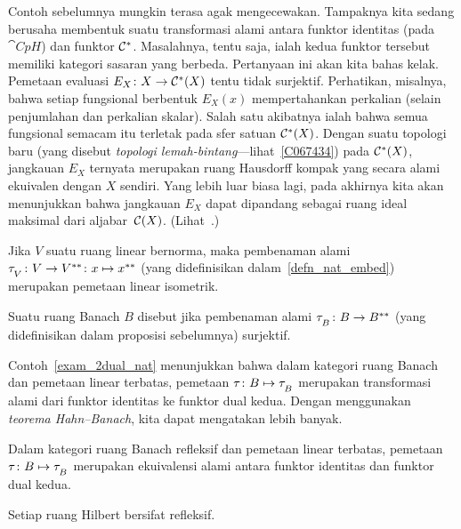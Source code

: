 Contoh sebelumnya mungkin terasa agak mengecewakan.  Tampaknya kita sedang
berusaha membentuk suatu transformasi alami antara funktor identitas (pada
$\cat{CpH}$) dan funktor $\mathcal{C}^*$.  Masalahnya, tentu saja, ialah kedua
funktor tersebut memiliki kategori sasaran yang berbeda.  Pertanyaan ini akan kita bahas kelak.
Pemetaan evaluasi $E_X\colon X \rightarrow \mathcal{C}^*(X)$ tentu tidak surjektif.
Perhatikan, misalnya, bahwa setiap fungsional berbentuk $E_X(x)$
mempertahankan perkalian (selain penjumlahan dan perkalian skalar). Salah satu akibatnya
ialah bahwa semua fungsional semacam itu terletak pada sfer satuan $\mathcal{C}^*(X)$.
Dengan suatu topologi baru (yang disebut \emph{topologi lemah-bintang}---lihat~\ref{C067434}) pada
$\mathcal{C}^*(X)$, jangkauan $E_X$ ternyata merupakan ruang Hausdorff kompak yang secara alami
ekuivalen dengan $X$ sendiri.  Yang lebih luar biasa lagi, pada akhirnya kita akan menunjukkan bahwa jangkauan $E_X$
dapat dipandang sebagai ruang ideal maksimal dari aljabar~$\mathcal{C}(X)$. (Lihat~.)

\begin{prop}\label{C067137} Jika $V$ suatu ruang linear bernorma, maka pembenaman alami
$\tau_{{}_{\scriptstyle{V}}} \colon V \rightarrow V^{**}\colon x \mapsto x^{**}$ (yang didefinisikan dalam~\ref{defn_nat_embed})
merupakan pemetaan linear isometrik.
\end{prop}

\begin{defn} Suatu ruang Banach $B$ disebut
 jika pembenaman alami $\tau_{{}_{\scriptstyle{B}}}\colon B \rightarrow B^{**}$ (yang didefinisikan dalam proposisi sebelumnya) surjektif.
\end{defn}

Contoh~\ref{exam_2dual_nat} menunjukkan bahwa dalam kategori ruang Banach dan pemetaan linear terbatas,
pemetaan $\tau\colon B \mapsto \tau_{{}_{\scriptstyle{B}}}$ merupakan transformasi alami dari
funktor identitas ke funktor dual kedua.  Dengan menggunakan \emph{teorema Hahn--Banach}, kita dapat
mengatakan lebih banyak.

\begin{prop} Dalam kategori ruang Banach refleksif dan pemetaan linear terbatas, pemetaan
$\tau\colon B \mapsto \tau_{{}_{\scriptstyle{B}}}$ merupakan ekuivalensi alami antara funktor identitas dan
funktor dual kedua.
\end{prop}

\begin{exam} Setiap ruang Hilbert bersifat refleksif.
\end{exam}

